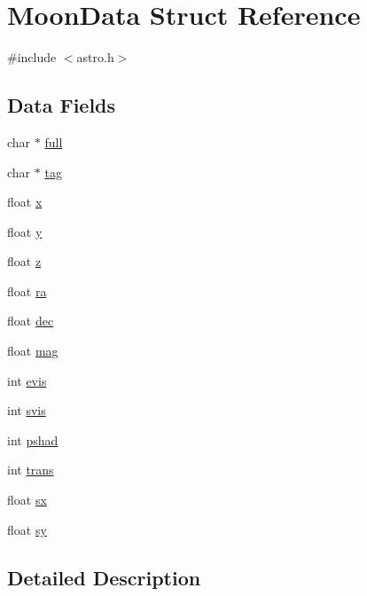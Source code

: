 \hypertarget{struct_moon_data}{\section{Moon\-Data Struct Reference}
\label{struct_moon_data}
}


{\ttfamily \#include $<$astro.\-h$>$}

\subsection*{Data Fields}
\begin{DoxyCompactItemize}
\item 
char $\ast$ \hyperlink{struct_moon_data_aa024691b4ac16b92266ab38a60f577de}{full}
\item 
char $\ast$ \hyperlink{struct_moon_data_a020cf502b1c9d753437536a96e720e4f}{tag}
\item 
float \hyperlink{struct_moon_data_a110bde8aec53cfffb6c7d363132ac00e}{x}
\item 
float \hyperlink{struct_moon_data_ae881979990e1b8db4096669aeb9455c1}{y}
\item 
float \hyperlink{struct_moon_data_a12e475b14fd62a7f40c0a5bfa9bbe55e}{z}
\item 
float \hyperlink{struct_moon_data_a3421e5d46efb7f485229ca92e34d07f2}{ra}
\item 
float \hyperlink{struct_moon_data_a621f6392fbcb83e989409e8be3568282}{dec}
\item 
float \hyperlink{struct_moon_data_ab42a1f4af07b83748607e1a27f8ddb3a}{mag}
\item 
int \hyperlink{struct_moon_data_a24226b259db68849973b400bf537ea9b}{evis}
\item 
int \hyperlink{struct_moon_data_a773e32d49166a22e7a4360dc5839378a}{svis}
\item 
int \hyperlink{struct_moon_data_aa7bc2863bec73b5fff8da2801aaaf94a}{pshad}
\item 
int \hyperlink{struct_moon_data_abeabac896bfd13b42eaeb73319d045f8}{trans}
\item 
float \hyperlink{struct_moon_data_a5dd6074e04eef9733b4cf35ec2be9b15}{sx}
\item 
float \hyperlink{struct_moon_data_a1481727f5f0a7a2014ee88ee94e03b02}{sy}
\end{DoxyCompactItemize}


\subsection{Detailed Description}


